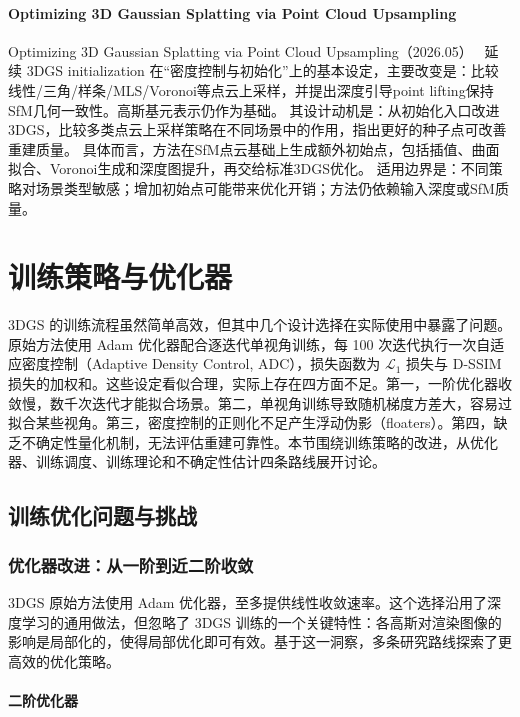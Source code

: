 \paragraph{Optimizing 3D Gaussian Splatting via Point Cloud Upsampling}
Optimizing 3D Gaussian Splatting via Point Cloud Upsampling（2026.05）~\cite{2606_00450} 延续 3DGS initialization 在“密度控制与初始化”上的基本设定，主要改变是：比较线性/三角/样条/MLS/Voronoi等点云上采样，并提出深度引导point lifting保持SfM几何一致性。高斯基元表示仍作为基础。
其设计动机是：从初始化入口改进3DGS，比较多类点云上采样策略在不同场景中的作用，指出更好的种子点可改善重建质量。
具体而言，方法在SfM点云基础上生成额外初始点，包括插值、曲面拟合、Voronoi生成和深度图提升，再交给标准3DGS优化。
适用边界是：不同策略对场景类型敏感；增加初始点可能带来优化开销；方法仍依赖输入深度或SfM质量。
\section{训练策略与优化器}
\label{sec:02_3}

3DGS 的训练流程虽然简单高效，但其中几个设计选择在实际使用中暴露了问题。原始方法使用 Adam 优化器配合逐迭代单视角训练，每 100 次迭代执行一次自适应密度控制（Adaptive Density Control, ADC），损失函数为 $\mathcal{L}_1$ 损失与 D-SSIM 损失的加权和。这些设定看似合理，实际上存在四方面不足。第一，一阶优化器收敛慢，数千次迭代才能拟合场景。第二，单视角训练导致随机梯度方差大，容易过拟合某些视角。第三，密度控制的正则化不足产生浮动伪影（floaters）。第四，缺乏不确定性量化机制，无法评估重建可靠性。本节围绕训练策略的改进，从优化器、训练调度、训练理论和不确定性估计四条路线展开讨论。

\subsection{训练优化问题与挑战}

\subsubsection{优化器改进：从一阶到近二阶收敛}

3DGS 原始方法使用 Adam 优化器，至多提供线性收敛速率。这个选择沿用了深度学习的通用做法，但忽略了 3DGS 训练的一个关键特性：各高斯对渲染图像的影响是局部化的，使得局部优化即可有效。基于这一洞察，多条研究路线探索了更高效的优化策略。

\paragraph{二阶优化器}

